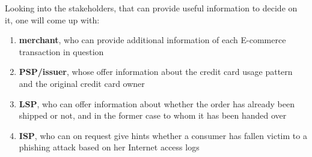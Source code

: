 Looking into the stakeholders, that can provide useful information to decide on it, one will come up with:\@

\begin{enumerate}
    \item \textbf{merchant}, who can provide additional information of each E-commerce transaction in question
    \item \textbf{\gls{PSP}/issuer}, whose offer information about the credit card usage pattern and the original credit card owner
    \item \textbf{\gls{LSP}}, who can offer information about whether the order has already been shipped or not, and in the former case to whom it has been handed over
    \item \textbf{\gls{ISP}}, who can on request give hints whether a consumer has fallen victim to a phishing attack based on her Internet access logs
\end{enumerate}

